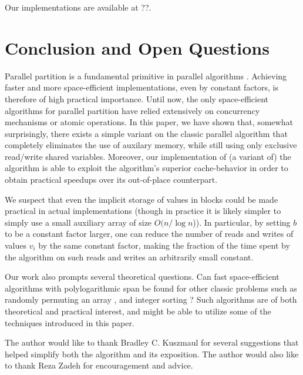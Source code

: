 \documentclass[sigplan, twocolumn]{amsart}
\renewcommand{\paragraph}[1]{\vspace{0.09in}\noindent{\bf \boldmath #1.}}
\theoremstyle{remark}
\theoremstyle{remark}
\begin{document}
Our implementations are available at ??.

\section{Conclusion and Open Questions}

Parallel partition is a fundamental primitive in parallel algorithms
\cite{Blelloch96,AcarBl16}. Achieving faster and more space-efficient
implementations, even by constant factors, is therefore of high
practical importance. Until now, the only space-efficient algorithms
for parallel partition have relied extensively on concurrency
mechanisms or atomic operations. In this paper, we have shown that,
somewhat surprisingly, there exists a simple variant on the classic
parallel algorithm that completely eliminates the use of auxilary
memory, while still using only exclusive read/write shared
variables. Moreover, our implementation of (a variant of) the
algorithm is able to exploit the algorithm's superior cache-behavior
in order to obtain practical speedups over its out-of-place
counterpart.

We suspect that even the implicit storage of values in blocks could be
made practical in actual implementations (though in practice it is
likely simpler to simply use a small auxiliary array of size $O(n /
\log n$)). In particular, by setting $b$ to be a constant factor
larger, one can reduce the number of reads and writes of values $v_i$
by the same constant factor, making the fraction of the time spent by
the algorithm on such reads and writes an arbitrarily small constant.

Our work also prompts several theoretical questions. Can fast space-efficient
algorithms with polylogarithmic span be found for other classic
problems such as randomly permuting an array \cite{Anderson90,
  AlonsoSc96, ShunGu15}, and integer sorting \cite{Rajasekaran92,
  HanHe12, AlbersHa97, Han01, GerbessiotisSi04}? Such algorithms are of both theoretical
and practical interest, and might be able to utilize some of the
techniques introduced in this paper.

\paragraph{Acknowledgments} The author would like to thank Bradley C. Kuszmaul for several suggestions that helped simplify both the algorithm and its exposition. The author would also like to thank Reza Zadeh for encouragement and advice.



\end{document}
